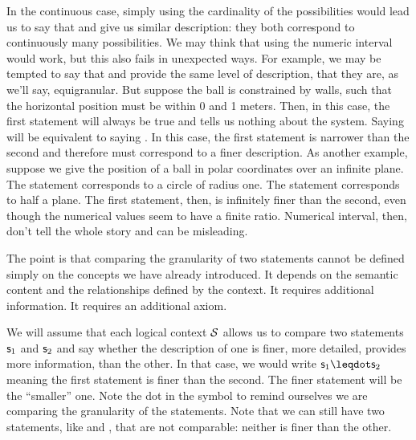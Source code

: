 \documentclass[11pt,letterpaper,fleqn]{memoir} %
\begin{document}
In the continuous case, simply using the cardinality of the possibilities would lead us to say that  and  give us similar description: they both correspond to continuously many possibilities. We may think that using the numeric interval would work, but this also fails in unexpected ways. For example, we may be tempted to say that  and  provide the same level of description, that they are, as we'll say, equigranular. But suppose the ball is constrained by walls, such that the horizontal position must be within 0 and 1 meters. Then, in this case, the first statement will always be true and tells us nothing about the system. Saying  will be equivalent to saying . In this case, the first statement is narrower than the second and therefore must correspond to a finer description. As another example, suppose we give the position of a ball in polar coordinates over an infinite plane. The statement  corresponds to a circle of radius one. The statement  corresponds to half a plane. The first statement, then, is infinitely finer than the second, even though the numerical values seem to have a finite ratio. Numerical interval, then, don't tell the whole story and can be misleading.


The point is that comparing the granularity of two statements cannot be defined simply on the concepts we have already introduced. It depends on the semantic content and the relationships defined by the context. It requires additional information. It requires an additional axiom.

We will assume that each logical context $\mathcal{S}$ allows us to compare two statements $\mathsf{s}_1$ and $\mathsf{s}_2$ and say whether the description of one is finer, more detailed, provides more information, than the other. In that case, we would write $\stmt_1 \finer \stmt_2$ meaning the first statement is finer than the second. The finer statement will be the ``smaller'' one. Note the dot in the symbol to remind ourselves we are comparing the granularity of the statements. Note that we can still have two statements, like  and , that are not comparable: neither is finer than the other.
\end{document}
